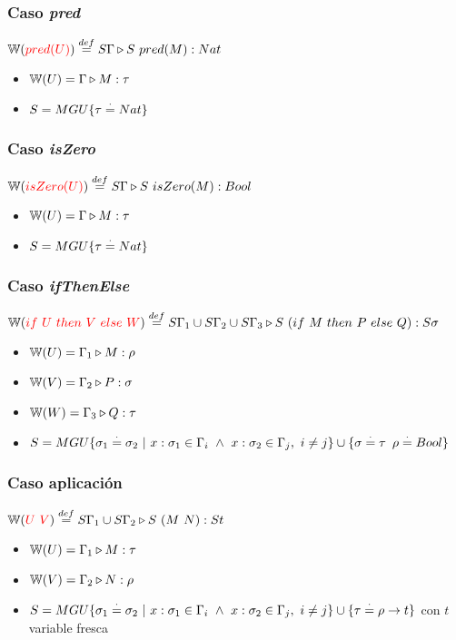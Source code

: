 \subsubsection{Caso \textit{pred}}
$\mathbb{W}({\color{red}pred(U)}) \overset{def}{=} S\Gamma\triangleright S~pred(M) : Nat$
\begin{centrado}
\begin{itemize}
\item $\mathbb{W}(U) = \Gamma\triangleright M : \tau$
\item $S = MGU\{\tau\overset{\cdot}{=} Nat\}$
\end{itemize}
\end{centrado}

\subsubsection{Caso \textit{isZero}}
$\mathbb{W}({\color{red}isZero(U)}) \overset{def}{=} S\Gamma\triangleright S~isZero(M) : Bool$
\begin{centrado}
\begin{itemize}
\item $\mathbb{W}(U) = \Gamma\triangleright M : \tau$
\item $S = MGU\{\tau\overset{\cdot}{=} Nat\}$
\end{itemize}
\end{centrado}

\subsubsection{Caso \textit{ifThenElse}}
$\mathbb{W}({\color{red}if~ U~ then~ V~ else~ W}) \overset{def}{=} S\Gamma_1\cup S\Gamma_2\cup S\Gamma_3\triangleright S~(if~ M~ then~ P~ else~ Q) : S\sigma$
\begin{centrado}
\begin{itemize}
\item $\mathbb{W}(U) = \Gamma_1\triangleright M : \rho$
\item $\mathbb{W}(V) = \Gamma_2\triangleright P : \sigma$
\item $\mathbb{W}(W) = \Gamma_3\triangleright Q : \tau$
\item $S = MGU\{\sigma_1\overset{\cdot}{=} \sigma_2~|~x:\sigma_1\in\Gamma_i~\land~x:\sigma_2\in\Gamma_j,~i\neq j\}\cup\{\sigma\overset{\cdot}{=}\tau\,~\rho\overset{\cdot}{=} Bool\}$
\end{itemize}
\end{centrado}

\subsubsection{Caso aplicación}
$\mathbb{W}({\color{red}U~V}) \overset{def}{=} S\Gamma_1\cup S\Gamma_2\triangleright S~(M~N) : St$
\begin{centrado}
\begin{itemize}
\item $\mathbb{W}(U) = \Gamma_1\triangleright M : \tau$
\item $\mathbb{W}(V) = \Gamma_2\triangleright N : \rho$
\item $S = MGU\{\sigma_1\overset{\cdot}{=} \sigma_2~|~x:\sigma_1\in\Gamma_i~\land~x:\sigma_2\in\Gamma_j,~i\neq j\}\cup\{\tau\overset{\cdot}{=}\rho\to t\}$ con $t$ variable fresca
\end{itemize}
\end{centrado}

